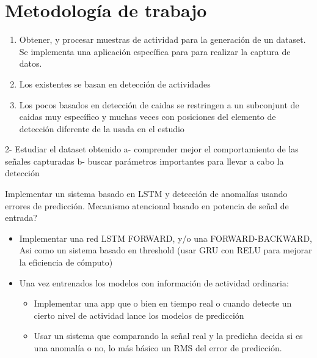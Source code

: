 \documentclass[../tfm.tex]{subfiles}
\begin{document}

\section{Metodología de trabajo}

\begin{enumerate}
  \item Obtener, y procesar muestras de actividad para la generación de un dataset. Se implementa una aplicación específica para para realizar la captura de datos.
    \item Los existentes se basan en detección de actividades
    \item Los pocos basados en detección de caidas se restringen a un subconjunt de caidas muy específico y muchas veces con posiciones del elemento de detección diferente de la usada en el estudio
  \end{enumerate}

  2- Estudiar el dataset obtenido
  a- comprender mejor el comportamiento de las señales capturadas
  b- buscar parámetros importantes para llevar a cabo la detección

  \item Implementar un sistema basado en LSTM y detección de anomalías usando errores de predicción. Mecanismo atencional basado en potencia de señal de entrada?
  \begin{itemize}
    \item Implementar una red LSTM FORWARD, y/o una FORWARD-BACKWARD, Asi como un sistema basado en threshold (usar GRU con RELU para mejorar la eficiencia de cómputo)
    \item Una vez entrenados los modelos con información de actividad ordinaria:
    \begin{itemize}
      \item Implementar una app que o bien en tiempo real o cuando detecte un cierto nivel de actividad lance los modelos de predicción
      \item Usar un sistema que comparando la señal real y la predicha decida si es una anomalía o no, lo más básico un RMS del error de predicción.
    \end{itemize}
  \end{itemize}
\end{document}
